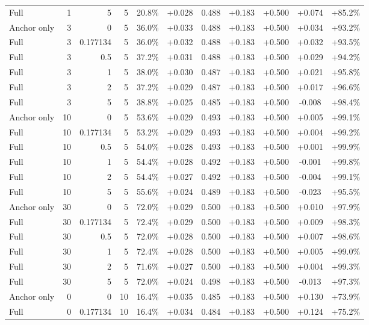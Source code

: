 \begin{table}[htbp]
\begin{tabular}{lrrrccccccc}
Full & 1 & 5 & 5 & 20.8\% & +0.028 & 0.488 & +0.183 & +0.500 & +0.074 & +85.2\% \\
Anchor only & 3 & 0 & 5 & 36.0\% & +0.033 & 0.488 & +0.183 & +0.500 & +0.034 & +93.2\% \\
Full & 3 & 0.177134 & 5 & 36.0\% & +0.032 & 0.488 & +0.183 & +0.500 & +0.032 & +93.5\% \\
Full & 3 & 0.5 & 5 & 37.2\% & +0.031 & 0.488 & +0.183 & +0.500 & +0.029 & +94.2\% \\
Full & 3 & 1 & 5 & 38.0\% & +0.030 & 0.487 & +0.183 & +0.500 & +0.021 & +95.8\% \\
Full & 3 & 2 & 5 & 37.2\% & +0.029 & 0.487 & +0.183 & +0.500 & +0.017 & +96.6\% \\
Full & 3 & 5 & 5 & 38.8\% & +0.025 & 0.485 & +0.183 & +0.500 & -0.008 & +98.4\% \\
Anchor only & 10 & 0 & 5 & 53.6\% & +0.029 & 0.493 & +0.183 & +0.500 & +0.005 & +99.1\% \\
Full & 10 & 0.177134 & 5 & 53.2\% & +0.029 & 0.493 & +0.183 & +0.500 & +0.004 & +99.2\% \\
Full & 10 & 0.5 & 5 & 54.0\% & +0.028 & 0.493 & +0.183 & +0.500 & +0.001 & +99.9\% \\
Full & 10 & 1 & 5 & 54.4\% & +0.028 & 0.492 & +0.183 & +0.500 & -0.001 & +99.8\% \\
Full & 10 & 2 & 5 & 54.4\% & +0.027 & 0.492 & +0.183 & +0.500 & -0.004 & +99.1\% \\
Full & 10 & 5 & 5 & 55.6\% & +0.024 & 0.489 & +0.183 & +0.500 & -0.023 & +95.5\% \\
Anchor only & 30 & 0 & 5 & 72.0\% & +0.029 & 0.500 & +0.183 & +0.500 & +0.010 & +97.9\% \\
Full & 30 & 0.177134 & 5 & 72.4\% & +0.029 & 0.500 & +0.183 & +0.500 & +0.009 & +98.3\% \\
Full & 30 & 0.5 & 5 & 72.0\% & +0.028 & 0.500 & +0.183 & +0.500 & +0.007 & +98.6\% \\
Full & 30 & 1 & 5 & 72.4\% & +0.028 & 0.500 & +0.183 & +0.500 & +0.005 & +99.0\% \\
Full & 30 & 2 & 5 & 71.6\% & +0.027 & 0.500 & +0.183 & +0.500 & +0.004 & +99.3\% \\
Full & 30 & 5 & 5 & 72.0\% & +0.024 & 0.498 & +0.183 & +0.500 & -0.013 & +97.3\% \\
Anchor only & 0 & 0 & 10 & 16.4\% & +0.035 & 0.485 & +0.183 & +0.500 & +0.130 & +73.9\% \\
Full & 0 & 0.177134 & 10 & 16.4\% & +0.034 & 0.484 & +0.183 & +0.500 & +0.124 & +75.2\% \\

\end{tabular}
\end{table}
